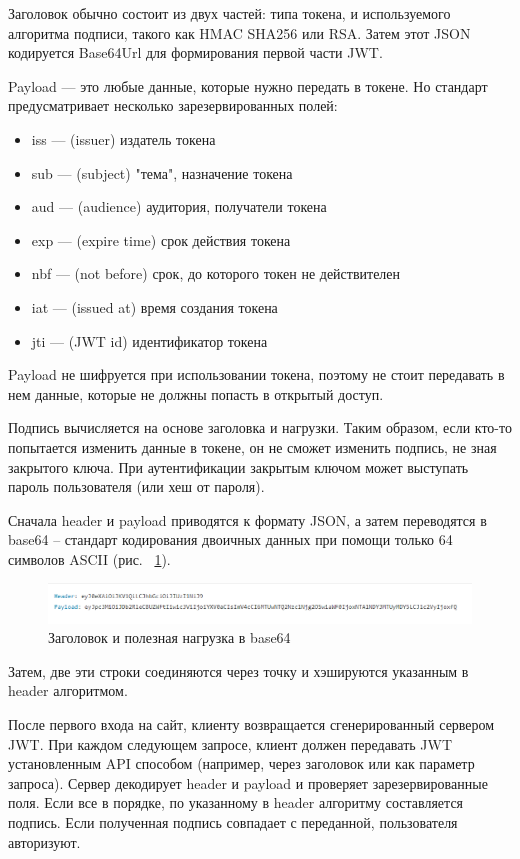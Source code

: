 \documentclass[12pt, a4paper]{diplom}
\begin{document}
Заголовок обычно состоит из двух частей: типа токена, и используемого алгоритма подписи, такого как HMAC SHA256 или RSA.
Затем этот JSON кодируется Base64Url для формирования первой части JWT.

Payload — это любые данные, которые нужно передать в токене. Но стандарт предусматривает несколько зарезервированных полей:

\begin{itemize}
  \item iss — (issuer) издатель токена
  \item sub — (subject) "тема", назначение токена
  \item aud — (audience) аудитория, получатели токена
  \item exp — (expire time) срок действия токена
  \item nbf — (not before) срок, до которого токен не действителен
  \item iat — (issued at) время создания токена
  \item jti — (JWT id) идентификатор токена
\end{itemize}

Payload не шифруется при использовании токена, поэтому не стоит передавать в нем данные, которые не должны попасть в открытый доступ.

Подпись вычисляется на основе заголовка и нагрузки. Таким образом, если кто-то попытается изменить данные в токене, он не сможет изменить подпись, не зная закрытого ключа. При аутентификации закрытым ключом может выступать пароль пользователя (или хеш от пароля).

Сначала header и payload приводятся к формату JSON, а затем переводятся в base64 -- стандарт кодирования двоичных данных при помощи только 64 символов ASCII (рис. ~\ref{c}).

\begin{figure}[!ht]
\centering
\includegraphics[width=1\textwidth]{resources/token.png}
\caption{Заголовок и полезная нагрузка в base64}
\label{c}
\end{figure}

Затем, две эти строки соединяются через точку и хэшируются указанным в header алгоритмом.

После первого входа на сайт, клиенту возвращается сгенерированный сервером JWT. При каждом следующем запросе, клиент должен передавать JWT установленным API способом (например, через заголовок или как параметр запроса). Сервер декодирует header и payload и проверяет зарезервированные поля. Если все в порядке, по указанному в header алгоритму составляется подпись. Если полученная подпись совпадает с переданной, пользователя авторизуют. 
\end{document}

